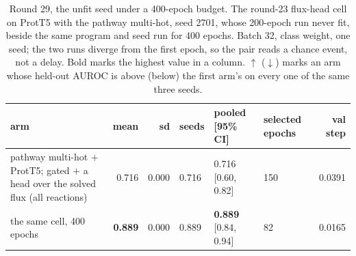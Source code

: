 \begin{table}[H]
  \centering
  \scriptsize
  \setlength{\tabcolsep}{2.5pt}
  \caption[Round 29, the unfit seed under a 400-epoch budget]{Round 29, the unfit seed under a 400-epoch budget. The round-23 flux-head cell on ProtT5 with the pathway multi-hot, seed 2701, whose 200-epoch run never fit, beside the same program and seed run for 400 epochs. Batch 32, class weight, one seed; the two runs diverge from the first epoch, so the pair reads a chance event, not a delay. Bold marks the highest value in a column. $\uparrow$ ($\downarrow$) marks an arm whose held-out AUROC is above (below) the first arm's on every one of the same three seeds.}
  \label{tab:w45}
  \begin{tabular}{@{}lrrlllr@{}}
    \hline
    arm & mean & sd & seeds & pooled [95\% CI] & selected epochs & val step \\
    \hline
    pathway multi-hot $+$ ProtT5; gated $+$ a head over the solved flux (all reactions) & 0.716 & 0.000 & 0.716 & 0.716 [0.60, 0.82] & 150 & 0.0391 \\
    the same cell, 400 epochs & \textbf{0.889} & 0.000 & 0.889 & \textbf{0.889} [0.84, 0.94] & 82 & 0.0165 \\
    \hline
  \end{tabular}
\end{table}
